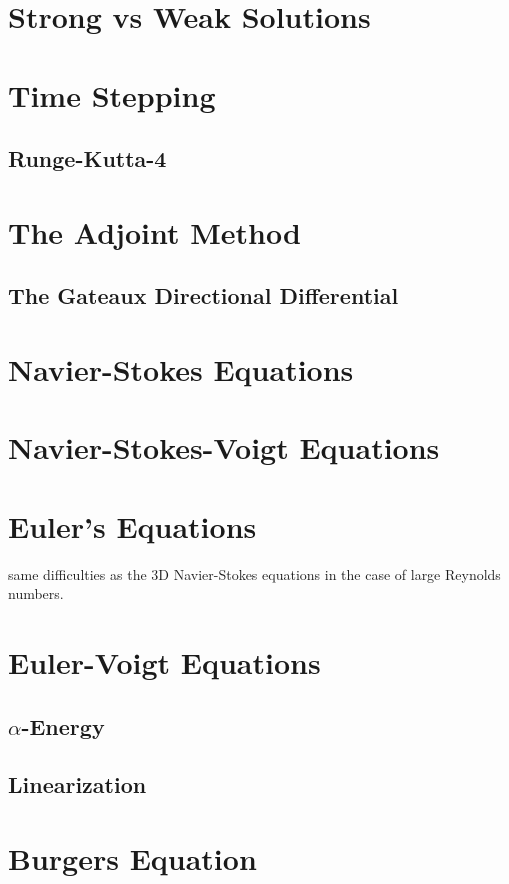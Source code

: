 \documentclass[12pt]{article}
\begin{document}
\begin{flushleft}
\section{Strong vs Weak Solutions}

\section{Time Stepping}
\subsection{Runge-Kutta-4}
 
\section{The Adjoint Method} 
\subsection{The Gateaux Directional Differential}
 
\section{Navier-Stokes Equations}

\section{Navier-Stokes-Voigt Equations} 
 
\section{Euler's Equations}
same difficulties as the 3D Navier-Stokes equations in the case of large Reynolds numbers.

\section{Euler-Voigt Equations}
\subsection{$\alpha$-Energy}
\subsection{Linearization}

\section{Burgers Equation}

\end{flushleft}
\end{document}
